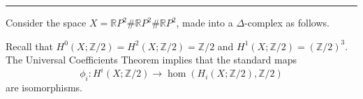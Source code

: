 \documentclass[letterpaper, 12pt]{article}
\begin{document}
\noindent\rule{7in}{2.8pt}

Consider the space \(X=\mathbb{R}P^2\#\mathbb{R}P^2\#\mathbb{R}P^2\), made into a \(\Delta\)-complex as follows.
\begin{figure}[ht]
\end{figure}
Recall that \(H^0(X;\mathbb{Z}/2)=H^2(X;\mathbb{Z}/2)=\mathbb{Z}/2\) and \(H^1(X;\mathbb{Z}/2)=(\mathbb{Z}/2)^3\). The Universal Coefficients Theorem implies that the standard maps
\[\phi_i:H^i(X;\mathbb{Z}/2)\rightarrow \hom(H_i(X;\mathbb{Z}/2),\mathbb{Z}/2)\]
are isomorphisms.
\end{document}
